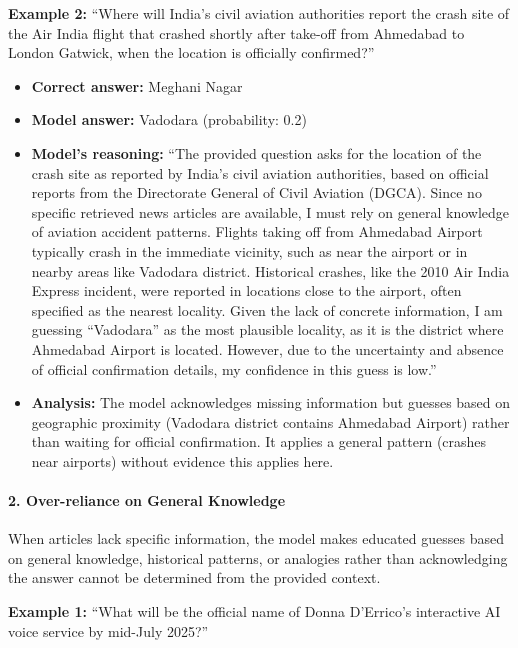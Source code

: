 \textbf{Example 2:} ``Where will India's civil aviation authorities report the crash site of the Air India flight that crashed shortly after take-off from Ahmedabad to London Gatwick, when the location is officially confirmed?''

\begin{itemize}
\item \textbf{Correct answer:} Meghani Nagar
\item \textbf{Model answer:} Vadodara (probability: 0.2)
\item \textbf{Model's reasoning:} ``The provided question asks for the location of the crash site as reported by India's civil aviation authorities, based on official reports from the Directorate General of Civil Aviation (DGCA). Since no specific retrieved news articles are available, I must rely on general knowledge of aviation accident patterns. Flights taking off from Ahmedabad Airport typically crash in the immediate vicinity, such as near the airport or in nearby areas like Vadodara district. Historical crashes, like the 2010 Air India Express incident, were reported in locations close to the airport, often specified as the nearest locality. Given the lack of concrete information, I am guessing ``Vadodara'' as the most plausible locality, as it is the district where Ahmedabad Airport is located. However, due to the uncertainty and absence of official confirmation details, my confidence in this guess is low.''
\item \textbf{Analysis:} The model acknowledges missing information but guesses based on geographic proximity (Vadodara district contains Ahmedabad Airport) rather than waiting for official confirmation. It applies a general pattern (crashes near airports) without evidence this applies here.
\end{itemize}

\paragraph{2. Over-reliance on General Knowledge}

When articles lack specific information, the model makes educated guesses based on general knowledge, historical patterns, or analogies rather than acknowledging the answer cannot be determined from the provided context.

\textbf{Example 1:} ``What will be the official name of Donna D'Errico's interactive AI voice service by mid-July 2025?''

